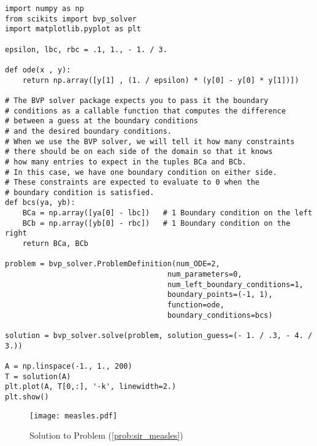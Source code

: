 \begin{lstlisting}
import numpy as np
from scikits import bvp_solver
import matplotlib.pyplot as plt

epsilon, lbc, rbc = .1, 1., - 1. / 3.

def ode(x , y):
    return np.array([y[1] , (1. / epsilon) * (y[0] - y[0] * y[1])]) 

# The BVP solver package expects you to pass it the boundary
# conditions as a callable function that computes the difference
# between a guess at the boundary conditions
# and the desired boundary conditions.
# When we use the BVP solver, we will tell it how many constraints
# there should be on each side of the domain so that it knows
# how many entries to expect in the tuples BCa and BCb.
# In this case, we have one boundary condition on either side.
# These constraints are expected to evaluate to 0 when the
# boundary condition is satisfied.
def bcs(ya, yb):
    BCa = np.array([ya[0] - lbc])   # 1 Boundary condition on the left
    BCb = np.array([yb[0] - rbc])   # 1 Boundary condition on the right
    return BCa, BCb

problem = bvp_solver.ProblemDefinition(num_ODE=2,
                                     num_parameters=0,
                                     num_left_boundary_conditions=1,
                                     boundary_points=(-1, 1),
                                     function=ode,
                                     boundary_conditions=bcs)

solution = bvp_solver.solve(problem, solution_guess=(- 1. / .3, - 4. / 3.))

A = np.linspace(-1., 1., 200)
T = solution(A)
plt.plot(A, T[0,:], '-k', linewidth=2.)
plt.show()
\end{lstlisting}

\begin{figure}[ht]
\centering
\texttt{[image: measles.pdf]}
\caption{Solution to Problem (\ref{prob:sir_measles})}
\label{fig:sir4}
\end{figure}


